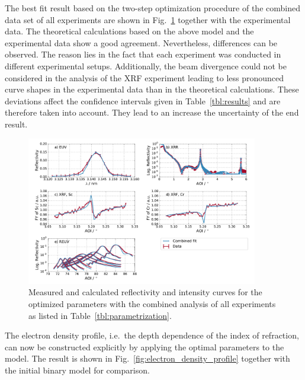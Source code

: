 \documentclass{iucr}              %
\begin{document}
The best fit result based on the two-step optimization procedure of the combined data set of all experiments are shown in Fig.~\ref{fig:combined_fit_result} together with the experimental data. The theoretical calculations based on the above model and the experimental data show a good agreement. Nevertheless, differences can be observed. The reason lies in the fact that each experiment was conducted in different experimental setups. Additionally, the beam divergence could not be considered in the analysis of the XRF experiment leading to less pronounced curve shapes in the experimental data than in the theoretical calculations. These deviations affect the confidence intervals given in Table~\ref{tbl:results} and are therefore taken into account. They lead to an increase the uncertainty of the end result.
\onecolumn
\begin{figure}
  \centering
  \includegraphics[width=0.9\textwidth]{images/combined_fit_result}
  \caption{Measured and calculated reflectivity and intensity curves for the optimized parameters with the combined analysis of all experiments as listed in Table~\ref{tbl:parametrization}.}
  \label{fig:combined_fit_result}
\end{figure}
\twocolumn
The electron density profile, i.e.~the depth dependence of the index of refraction, can now be constructed explicitly by applying the optimal parameters to the model. The result is shown in Fig.~\ref{fig:electron_density_profile} together with the initial binary model for comparison.
\end{document}
